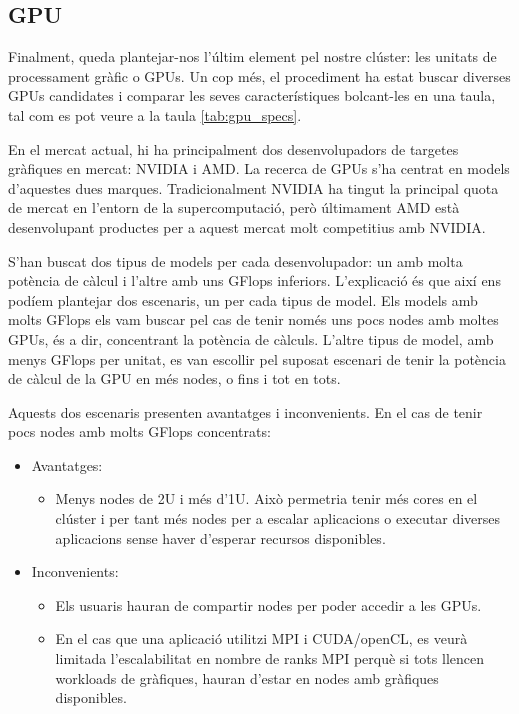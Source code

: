 \subsection{GPU}

Finalment, queda plantejar-nos l'últim element pel nostre clúster: les unitats de processament gràfic o GPUs. Un cop més, el procediment ha estat buscar diverses GPUs candidates i comparar les seves característiques bolcant-les en una taula, tal com es pot veure a la taula \ref{tab:gpu_specs}.



En el mercat actual, hi ha principalment dos desenvolupadors de targetes gràfiques en mercat: NVIDIA i AMD. La recerca de GPUs s'ha centrat en models d'aquestes dues marques. Tradicionalment NVIDIA ha tingut la principal quota de mercat en l'entorn de la supercomputació, però últimament AMD està desenvolupant productes per a aquest mercat molt competitius amb NVIDIA.

S'han buscat dos tipus de models per cada desenvolupador: un amb molta potència de càlcul i l'altre amb uns GFlops inferiors. L'explicació és que així ens podíem plantejar dos escenaris, un per cada tipus de model. 
Els models amb molts GFlops els vam buscar pel cas de tenir només uns pocs nodes amb moltes GPUs, és a dir, concentrant la potència de càlculs.
L'altre tipus de model, amb menys GFlops per unitat, es van escollir pel suposat escenari de tenir la potència de càlcul de la GPU en més nodes, o fins i tot en tots.

Aquests dos escenaris presenten avantatges i inconvenients. En el cas de tenir pocs nodes amb molts GFlops concentrats:
\begin{itemize}
    \item Avantatges:
    \begin{itemize}
        \item Menys nodes de 2U i més d'1U. Això permetria tenir més cores en el clúster i per tant més nodes per a escalar aplicacions o executar diverses aplicacions sense haver d'esperar recursos disponibles.
    \end{itemize}
    \item Inconvenients:
    \begin{itemize}
        \item Els usuaris hauran de compartir nodes per poder accedir a les GPUs. 
        \item En el cas que una aplicació utilitzi MPI i CUDA/openCL, es veurà limitada l'escalabilitat en nombre de ranks MPI perquè si tots llencen workloads de gràfiques, hauran d'estar en nodes amb gràfiques disponibles.
    \end{itemize}
\end{itemize}

